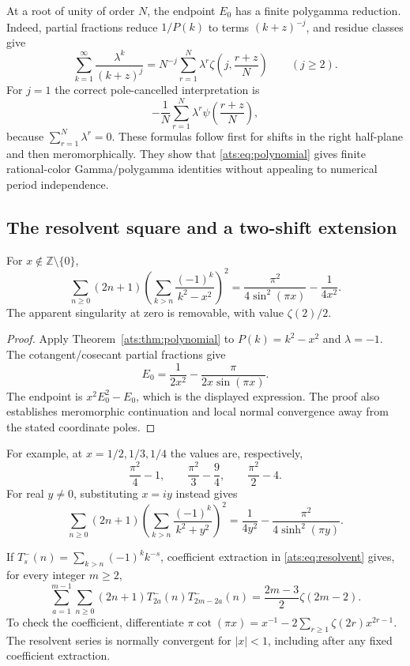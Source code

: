 At a root of unity of order $N$, the endpoint $E_0$ has a finite
polygamma reduction. Indeed, partial fractions reduce $1/P(k)$ to
terms $(k+z)^{-j}$, and residue classes give
\[
 \sum_{k=1}^{\infty}\frac{\lambda^k}{(k+z)^j}
 =N^{-j}\sum_{r=1}^{N}\lambda^r
                   \zeta\!\left(j,\frac{r+z}{N}\right)
 \qquad(j\ge2).
\]
For $j=1$ the correct pole-cancelled interpretation is
\[
 -\frac1N\sum_{r=1}^{N}\lambda^r
                         \psi\!\left(\frac{r+z}{N}\right),
\]
because $\sum_{r=1}^{N}\lambda^r=0$. These formulas follow first
for shifts in the right half-plane and then meromorphically. They
show that \eqref{ats:eq:polynomial} gives finite rational-color
Gamma/polygamma identities without appealing to numerical period
independence.

\subsection{The resolvent square and a two-shift extension}

\begin{corollary}
\label{ats:cor:resolvent}
For $x\notin\mathbb Z\setminus\{0\}$,
\begin{equation}\label{ats:eq:resolvent}
 \boxed{\displaystyle
 \sum_{n\ge0}(2n+1)
   \left(\sum_{k>n}\frac{(-1)^k}{k^2-x^2}\right)^2
 =\frac{\pi^2}{4\sin^2(\pi x)}-\frac1{4x^2}.}
\end{equation}
The apparent singularity at zero is removable, with value
$\zeta(2)/2$.
\end{corollary}

\begin{proof}
Apply Theorem~\ref{ats:thm:polynomial} to $P(k)=k^2-x^2$ and
$\lambda=-1$. The cotangent/cosecant partial fractions give
\[
 E_0=\frac1{2x^2}-\frac{\pi}{2x\sin(\pi x)}.
\]
The endpoint is $x^2E_0^2-E_0$, which is the displayed expression.
The proof also establishes meromorphic continuation and local normal
convergence away from the stated coordinate poles.
\end{proof}

For example, at $x=1/2,1/3,1/4$ the values are, respectively,
\[
 \frac{\pi^2}{4}-1,\qquad
 \frac{\pi^2}{3}-\frac94,\qquad
 \frac{\pi^2}{2}-4.
\]
For real $y\ne0$, substituting $x=iy$ instead gives
\[
 \sum_{n\ge0}(2n+1)
   \left(\sum_{k>n}\frac{(-1)^k}{k^2+y^2}\right)^2
 =\frac1{4y^2}-\frac{\pi^2}{4\sinh^2(\pi y)}.
\]

If $T_s^-(n)=\sum_{k>n}(-1)^k k^{-s}$, coefficient extraction in
\eqref{ats:eq:resolvent} gives, for every integer $m\ge2$,
\begin{equation}\label{ats:eq:convolution}
 \sum_{a=1}^{m-1}\sum_{n\ge0}(2n+1)
            T_{2a}^-(n)T_{2m-2a}^-(n)
 =\frac{2m-3}{2}\zeta(2m-2).
\end{equation}
To check the coefficient, differentiate
$\pi\cot(\pi x)=x^{-1}-2\sum_{r\ge1}\zeta(2r)x^{2r-1}$.
The resolvent series is normally convergent for $|x|<1$, including
after any fixed coefficient extraction.

